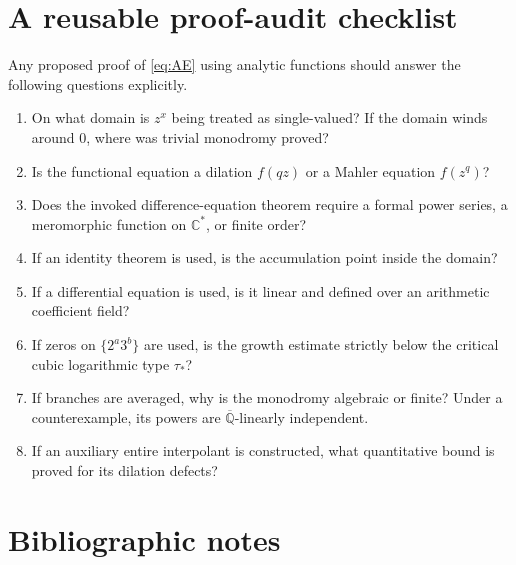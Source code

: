 \documentclass[11pt,oneside]{article}
\theoremstyle{definition}
\theoremstyle{remark}
\newcommand{\C}{\mathbb C}
\newcommand{\Qbar}{\overline{\mathbb Q}}
\begin{document}
\section{A reusable proof-audit checklist}

Any proposed proof of \eqref{eq:AE} using analytic functions should answer the following questions explicitly.

\begin{enumerate}[label=\textbf{A\arabic*.}]
\item On what domain is \(z^x\) being treated as single-valued?  If the domain winds around \(0\), where was trivial monodromy proved?
\item Is the functional equation a dilation \(f(qz)\) or a Mahler equation \(f(z^q)\)?
\item Does the invoked difference-equation theorem require a formal power series, a meromorphic function on \(\C^*\), or finite order?
\item If an identity theorem is used, is the accumulation point inside the domain?
\item If a differential equation is used, is it linear and defined over an arithmetic coefficient field?
\item If zeros on \(\{2^a3^b\}\) are used, is the growth estimate strictly below the critical cubic logarithmic type \(\tau_*\)?
\item If branches are averaged, why is the monodromy algebraic or finite?  Under a counterexample, its powers are \(\Qbar\)-linearly independent.
\item If an auxiliary entire interpolant is constructed, what quantitative bound is proved for its dilation defects?
\end{enumerate}

\section{Bibliographic notes}
\end{document}
